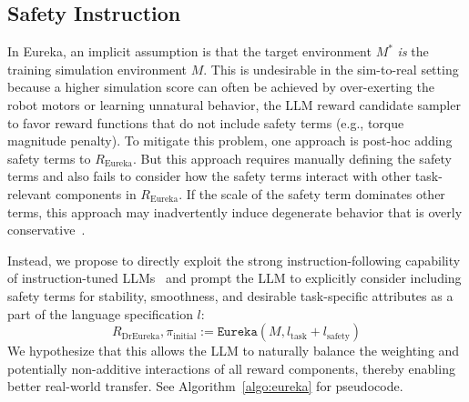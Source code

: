\documentclass[conference]{IEEEtran}
\begin{document}
\subsection{Safety Instruction}
\label{sec:safety}
In Eureka, an implicit assumption is that the target environment $M^*$ \textit{is} the training simulation environment $M$. 
This is undesirable in the sim-to-real setting because a higher simulation score can often be achieved by over-exerting the robot motors or learning unnatural behavior,  the LLM reward candidate sampler to favor reward functions that do not include safety terms (e.g., torque magnitude penalty). To mitigate this problem, one approach is post-hoc adding safety terms to $R_{\text{Eureka}}$. But this approach requires manually defining the safety terms and also fails to consider how the safety terms interact with other task-relevant components in $R_{\text{Eureka}}$. If the scale of the safety term dominates other terms, this approach may inadvertently induce degenerate behavior that is overly conservative~\citep{kim2023not}. 

Instead, we propose to directly exploit the strong instruction-following capability of instruction-tuned LLMs~\citep{ouyang2022training} and prompt the LLM to explicitly consider including safety terms for stability, smoothness, and desirable task-specific attributes as a part of the language specification $l$: 
\begin{equation}
\label{eq:eureka-safety}
    R_{\text{DrEureka}}, \pi_{\text{initial}} := \texttt{Eureka}(M, l_{\text{task}}+l_{\text{safety}}) 
\end{equation}
We hypothesize that this allows the LLM to naturally balance the weighting and potentially non-additive interactions of all reward components, thereby enabling better real-world transfer. See Algorithm~\ref{algo:eureka} for pseudocode. 
\end{document}
